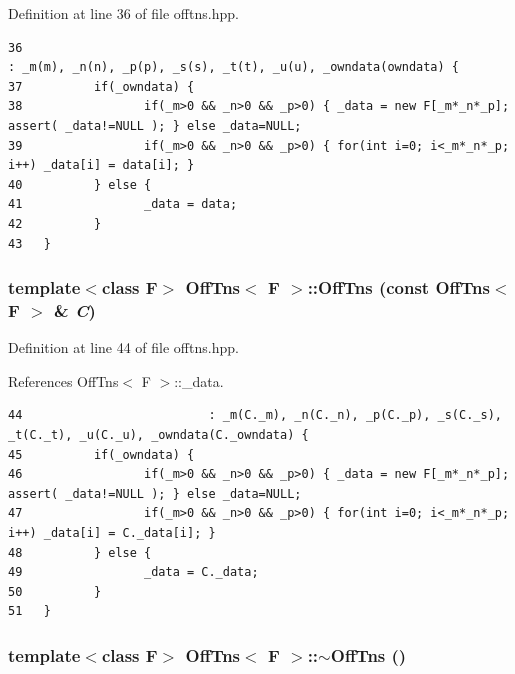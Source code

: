 Definition at line 36 of file offtns.hpp.

\footnotesize\begin{verbatim}36                                                                          : _m(m), _n(n), _p(p), _s(s), _t(t), _u(u), _owndata(owndata) {
37          if(_owndata) {
38                 if(_m>0 && _n>0 && _p>0) { _data = new F[_m*_n*_p]; assert( _data!=NULL ); } else _data=NULL;
39                 if(_m>0 && _n>0 && _p>0) { for(int i=0; i<_m*_n*_p; i++) _data[i] = data[i]; }
40          } else {
41                 _data = data;
42          }
43   }
\end{verbatim}\normalsize 


\subsubsection{\setlength{\rightskip}{0pt plus 5cm}template$<$class F$>$ {\bf Off\-Tns}$<$ F $>$::{\bf Off\-Tns} (const {\bf Off\-Tns}$<$ F $>$ \& {\em C})\hspace{0.3cm}{\tt  [inline]}}\label{classOffTns_d99b9f622e1294e289ccfd166689c49f_d99b9f622e1294e289ccfd166689c49f}




Definition at line 44 of file offtns.hpp.

References Off\-Tns$<$ F $>$::\_\-data.

\footnotesize\begin{verbatim}44                          : _m(C._m), _n(C._n), _p(C._p), _s(C._s), _t(C._t), _u(C._u), _owndata(C._owndata) {
45          if(_owndata) {
46                 if(_m>0 && _n>0 && _p>0) { _data = new F[_m*_n*_p]; assert( _data!=NULL ); } else _data=NULL;
47                 if(_m>0 && _n>0 && _p>0) { for(int i=0; i<_m*_n*_p; i++) _data[i] = C._data[i]; }
48          } else {
49                 _data = C._data;
50          }
51   }
\end{verbatim}\normalsize 


\subsubsection{\setlength{\rightskip}{0pt plus 5cm}template$<$class F$>$ {\bf Off\-Tns}$<$ F $>$::$\sim${\bf Off\-Tns} ()\hspace{0.3cm}{\tt  [inline]}}\label{classOffTns_a0333249bc8f02047b51fd7308fbf03e_a0333249bc8f02047b51fd7308fbf03e}




